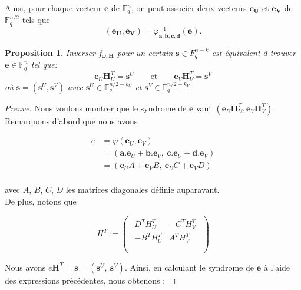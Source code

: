 \documentclass[12pt]{article}
\theoremstyle{plain}
\newtheorem{propo}[thm]{Proposition}
\theoremstyle{definition}
\newcommand{\F}{\mathbb{F}}
\newcommand{\e}{\mathbf{e}}
\newcommand{\s}{\mathbf{s}}
\begin{document}
\noindent Ainsi, pour chaque vecteur $\mathbf{e}$ de $\F_q^n$, on peut associer deux vecteurs $\mathbf{e_U}$ et $\mathbf{e_V}$ de $\F_q^{n/2}$ tels que 
$$ (\mathbf{e_U},\mathbf{e_V}) = \varphi^{-1}_{\mathbf{a},\mathbf{b},\mathbf{c},\mathbf{d}}(\mathbf{e}).$$

\begin{propo} Inverser $f_{\omega,\mathbf{H}}$ pour un certain $\mathbf{s} \in F_q^{n-k}$ est équivalent à trouver $\mathbf{e} \in \F_q^n$ tel que:
$$ \mathbf{e}_U\mathbf{H}_U^T = \mathbf{s}^U \qquad \text{et} \qquad \mathbf{e}_V\mathbf{H}_V^T = \mathbf{s}^V $$
où $\mathbf{s} = (\mathbf{s}^U, \mathbf{s}^V)$ avec $\mathbf{s}^U \in \F_q^{n/2-k_U}$ et $\mathbf{s}^V \in \F_q^{n/2-k_V}$.
\end{propo}

\begin{proof}[Preuve]
Nous voulons montrer que le syndrome de $\e$ vaut $(\e_U\mathbf{H}_U^T,\e_V\mathbf{H}_V^T)$.
Remarquons d'abord que nous avons

\begin{equation*}
\begin{split}
e &= \varphi(\e_U,\e_V)\\
&= (\mathbf{a}.\e_U + \mathbf{b}.\e_V,\ \mathbf{c}.\e_U + \mathbf{d}.\e_V)\\
&= (\e_U A + \e_V B,\ \e_U C + \e_V D)\\
\end{split}
\end{equation*}

\noindent avec $A$, $B$, $C$, $D$ les matrices diagonales définie auparavant.\\
De plus, notons que

\vspace{0.1in}
$$ 
H^T :=
\begin{pmatrix}
\begin{array}{c|c}
D^TH_U^T & -C^TH_V^T \\
 \hline 

-B^TH_U^T & A^TH_V^T \\
\end{array} \\
\end{pmatrix}
$$
\vspace{0.1in}

\noindent Nous avons $e\mathbf{H}^T = \s = (\s^U,\ \s^V)$. Ainsi, en calculant le syndrome de $\e$ à l'aide des expressions précédentes, nous obtenons :


\end{proof}
\end{document}
